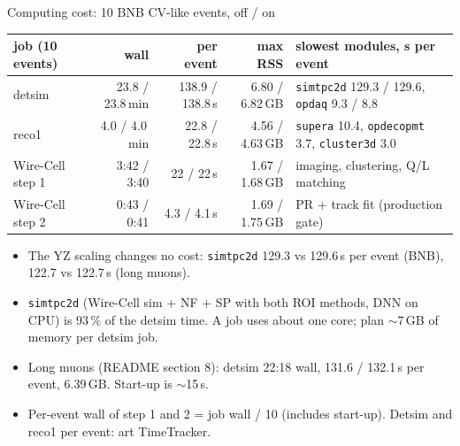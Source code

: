 \documentclass[aspectratio=169,10pt]{beamer}
\newcommand{\code}[1]{\texttt{#1}}
\begin{document}
\begin{frame}{Computing cost: 10 BNB CV-like events, off / on}
\small
\centering\footnotesize\setlength{\tabcolsep}{2.5pt}
\begin{tabular}{@{}lrrrl@{}}
\toprule
job (10 events) & wall & per event & max RSS & slowest modules, s per event \\
\midrule
detsim & 23.8 / 23.8\,min & 138.9 / 138.8\,s & 6.80 / 6.82\,GB & \code{simtpc2d} 129.3 / 129.6, \code{opdaq} 9.3 / 8.8 \\
reco1 & 4.0 / 4.0\,min & 22.8 / 22.8\,s & 4.56 / 4.63\,GB & \code{supera} 10.4, \code{opdecopmt} 3.7, \code{cluster3d} 3.0 \\
Wire-Cell step 1 & 3:42 / 3:40 & 22 / 22\,s & 1.67 / 1.68\,GB & imaging, clustering, Q/L matching \\
Wire-Cell step 2 & 0:43 / 0:41 & 4.3 / 4.1\,s & 1.69 / 1.75\,GB & PR + track fit (production gate) \\
\bottomrule
\end{tabular}
\raggedright\small
\vspace{3mm}
\begin{itemize}
\item The YZ scaling changes no cost: \code{simtpc2d} 129.3 vs 129.6\,s per event (BNB), 122.7 vs 122.7\,s (long muons).
\item \code{simtpc2d} (Wire-Cell sim + NF + SP with both ROI methods, DNN on CPU) is 93\,\% of the detsim time. A job uses about one core; plan $\sim$7\,GB of memory per detsim job.
\item Long muons (README section 8): detsim 22:18 wall, 131.6 / 132.1\,s per event, 6.39\,GB. Start-up is $\sim$15\,s.
\item Per-event wall of step 1 and 2 = job wall / 10 (includes start-up). Detsim and reco1 per event: art TimeTracker.
\end{itemize}
\end{frame}
\end{document}
